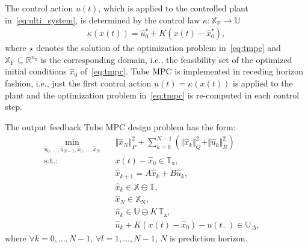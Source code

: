\documentclass[letterpaper, 10 pt, conference]{ieeeconf}
\begin{document}
The control action $u(t)$, which is applied to the controlled plant in~\eqref{eq:ulti_system}, is determined by the control law $\kappa : \mathbb{X}_{\mathrm{F}} \rightarrow \mathbb{U}$
\begin{eqnarray}
	\label{eq:tmpc_control_law}
	\kappa(x(t)) = \hat{u}_{0}^{\star} + K \left( x(t) - \hat{x}_{0}^{\star} \right),
\end{eqnarray}
where $\star$ denotes the solution of the optimization problem in~\eqref{eq:tmpc} and $\mathbb{X}_{\mathrm{F}} \subseteq \mathbb{R}^{n_{\mathrm{x}}}$ is the corresponding domain, i.e., the feasibility set of the optimized initial conditions $\hat{x}_{0}$ of~\eqref{eq:tmpc}. 
Tube MPC is implemented in receding horizon fashion, i.e., just the first control action $u(t) = \kappa(x(t))$ is applied to the plant and the optimization problem in~\eqref{eq:tmpc} is re-computed in each control step. 


The output feedback Tube MPC design problem has the form:
\begin{subequations}
	\label{eq:tmpc_output}
	\begin{eqnarray}
		\label{eq:tmpc_output_cost}
		\min_{\hat{u}_{0},\ldots,\hat{u}_{N-1}, \hat{x}_{0},\ldots,\hat{x}_{N} } \!\!\!\!\!\!\!\!\!\!\! &\,& \Vert \hat{x}_{N} \Vert_{P}^{2} + \sum_{k=0}^{N-1} \left( \Vert \hat{x}_{k} \Vert_{Q}^{2} + \Vert \hat{u}_{k} \Vert_{R}^{2} \right) \qquad \\
		\label{eq:tmpc_output_rpi}
		\mathrm{s.t.\!:} &\,& x(t) - \hat{x}_{0} \in \mathbb{T}_{\mathrm{x}} , \\
		\label{eq:tmpc_output_model}
		&\,&  \hat{x}_{k+1} = A \hat{x}_{k} + B \hat{u}_{k} , \\
		\label{eq:tmpc_output_constraints_state}
		&\,& \hat{x}_{k} \in \mathbb{X} \ominus \mathbb{T} , \\
		\label{eq:tmpc_output_constraints_terminal}
		&\,& \hat{x}_{N} \in \mathbb{X}_{\mathrm{N}}, \\
		\label{eq:tmpc_output_constraints_input}
		&\,& \hat{u}_{k} \in \mathbb{U} \ominus K \, \mathbb{T}_{\mathrm{x}} , \\
		\label{eq:tmpc_output_constraints_input_delta_0}
		&\,& \hat{u}_{k} + K ( x(t) - \hat{x}_{0} ) - u(t_{-}) \in \mathbb{U}_{\Delta} , \quad
	\end{eqnarray}
\end{subequations}
where $\forall k = 0, \dots, N-1$,  $\forall l = 1, \dots, N-1$, $N$ is prediction horizon.
\end{document}
